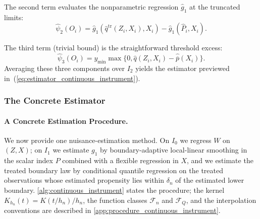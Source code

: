     The second term evaluates the nonparametric regression $\hat{g}_1$ at the truncated limits:
    \begin{equation*}
        \hat\psi_2(O_i)=\hat g_1(\hat q^{\mathrm{tr}}(Z_i,X_i),X_i)-\hat g_1(\hat P_i,X_i).
    \end{equation*}

    The third term (trivial bound) is the straightforward threshold excess:
    \begin{equation*}
        \hat\psi_3(O_i)=y_{\min}\max\{0,\hat q(Z_i,X_i)-\hat{\overline p}(X_i)\}.
    \end{equation*}
    Averaging these three components over $I_2$ yields the estimator previewed in~(\ref{eq:estimator_continuous_instrument}).


\subsubsection{The Concrete Estimator}\label{app:continuous_concrete}

\paragraph{A Concrete Estimation Procedure.} We now provide one nuisance-estimation method. On $I_0$ we regress $W$ on $(Z,X)$; on $I_1$ we estimate $g_1$ by boundary-adaptive local-linear smoothing in the scalar index $P$ combined with a flexible regression in $X$, and we estimate the treated boundary law by conditional quantile regression on the treated observations whose estimated propensity lies within $\delta_n$ of the estimated lower boundary. \cref{alg:continuous_instrument} states the procedure; the kernel $K_{h_n}(t)=K(t/h_n)/h_n$, the function classes $\mathcal F_n$ and $\mathcal F_Q$, and the interpolation conventions are described in \cref{app:procedure_continuous_instrument}.

